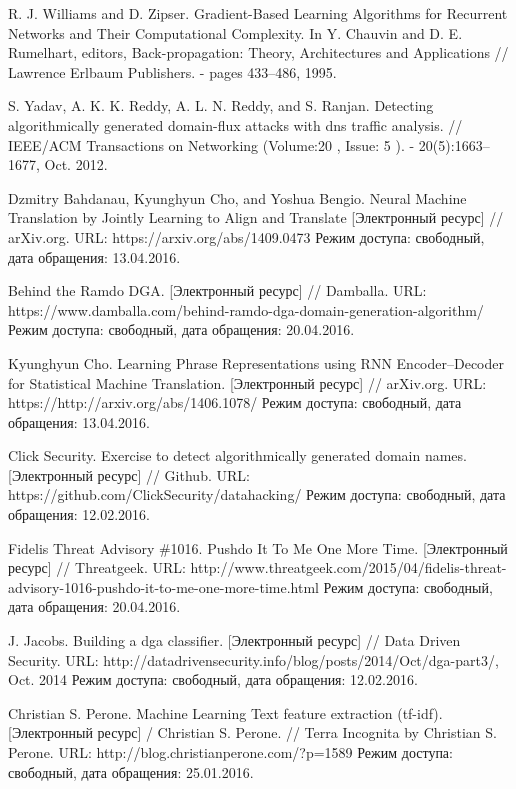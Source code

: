 \begin{thebibliography}{00}
    R. J. Williams and D. Zipser. Gradient-Based Learning Algorithms for Recurrent Networks and Their Computational Complexity. In Y. Chauvin and D. E. Rumelhart, editors, Back-propagation: Theory, Architectures and Applications // Lawrence Erlbaum Publishers. - pages 433–486, 1995.

    S. Yadav, A. K. K. Reddy, A. L. N. Reddy, and S. Ranjan.
    Detecting algorithmically generated domain-flux attacks with dns traffic analysis. //
    IEEE/ACM Transactions on Networking  (Volume:20 ,  Issue: 5 ). - 20(5):1663–1677, Oct. 2012.

    Dzmitry Bahdanau, Kyunghyun Cho, and Yoshua Bengio.
    Neural Machine Translation by Jointly Learning to Align and Translate [Электронный ресурс] // arXiv.org.
    URL: https://arxiv.org/abs/1409.0473
    Режим доступа: свободный, дата обращения: 13.04.2016.

    Behind the Ramdo DGA. [Электронный ресурс] // Damballa.
    URL: https://www.damballa.com/behind-ramdo-dga-domain-generation-algorithm/
    Режим доступа: свободный, дата обращения: 20.04.2016.

    Kyunghyun Cho.
    Learning Phrase Representations using RNN Encoder–Decoder for Statistical Machine Translation. [Электронный ресурс] // arXiv.org.
    URL: https://http://arxiv.org/abs/1406.1078/
    Режим доступа: свободный, дата обращения: 13.04.2016.

    Click Security. Exercise to detect algorithmically generated domain names.
    [Электронный ресурс] // Github.
    URL: https://github.com/ClickSecurity/datahacking/
    Режим доступа: свободный, дата обращения: 12.02.2016.

    Fidelis Threat Advisory \#1016. Pushdo It To Me One More Time.
    [Электронный ресурс] // Threatgeek.
    URL: http://www.threatgeek.com/2015/04/fidelis-threat-advisory-1016-pushdo-it-to-me-one-more-time.html
    Режим доступа: свободный, дата обращения: 20.04.2016.

    J. Jacobs. Building a dga classifier.
    [Электронный ресурс] // Data Driven Security.
    URL: http://datadrivensecurity.info/blog/posts/2014/Oct/dga-part3/, Oct. 2014
    Режим доступа: свободный, дата обращения: 12.02.2016.

    Christian S. Perone. Machine Learning Text feature extraction (tf-idf). [Электронный ресурс] / Christian S. Perone. // Terra Incognita by Christian S. Perone.
    URL: http://blog.christianperone.com/?p=1589
    Режим доступа: свободный, дата обращения: 25.01.2016.


\end{thebibliography}
